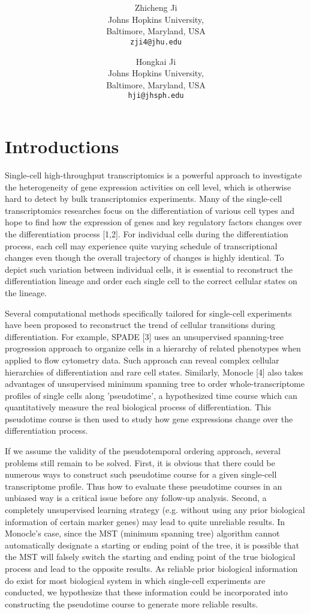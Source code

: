 \documentclass[10pt,oneside]{article}\usepackage[]{graphicx}\usepackage[]{color}
\title{\textsf{\textbf{\thetitle}}}
\author{Zhicheng Ji\\[1em]Johns Hopkins University,\\ Baltimore, Maryland, USA\\
\texttt{zji4@jhu.edu} \and
Hongkai Ji\\[1em]Johns Hopkins University,\\ Baltimore, Maryland, USA\\
\texttt{hji@jhsph.edu}}
\begin{document}
\maketitle

\tableofcontents

\section{Introductions}
Single-cell high-throughput transcriptomics is a powerful approach to investigate the heterogeneity of gene expression activities on cell level, which is otherwise hard to detect by bulk transcriptomics experiments. Many of the single-cell transcriptomics researches focus on the differentiation of various cell types and hope to find how the expression of genes and key regulatory factors changes over the differentiation process [1,2]. For individual cells during the differentiation process, each cell may experience quite varying schedule of transcriptional changes even though the overall trajectory of changes is highly identical. To depict such variation between individual cells, it is essential to reconstruct the differentiation lineage and order each single cell to the correct cellular states on the lineage.

Several computational methods specifically tailored for single-cell experiments have been proposed to reconstruct the trend of cellular transitions during differentiation. For example, SPADE [3] uses an unsupervised spanning-tree progression approach to organize cells in a hierarchy of related phenotypes when applied to flow cytometry data. Such approach can reveal complex cellular hierarchies of differentiation and rare cell states. Similarly, Monocle [4] also takes advantages of unsupervised minimum spanning tree to order whole-transcriptome profiles of single cells along 'pseudotime', a hypothesized time course which can quantitatively measure the real biological process of differentiation. This pseudotime course is then used to study how gene expressions change over the differentiation process.

If we assume the validity of the pseudotemporal ordering approach, several problems still remain to be solved. First, it is obvious that there could be numerous ways to construct such pseudotime course for a given single-cell transcriptome profile. Thus how to evaluate these pseudotime courses in an unbiased way is a critical issue before any follow-up analysis. Second, a completely unsupervised learning strategy (e.g. without using any prior biological information of certain marker genes) may lead to quite unreliable results. In Monocle’s case, since the MST (minimum spanning tree) algorithm cannot automatically designate a starting or ending point of the tree, it is possible that the MST will falsely switch the starting and ending point of the true biological process and lead to the opposite results. As reliable prior biological information do exist for most biological system in which single-cell experiments are conducted, we hypothesize that these information could be incorporated into constructing the pseudotime course to generate more reliable results.
\end{document}
